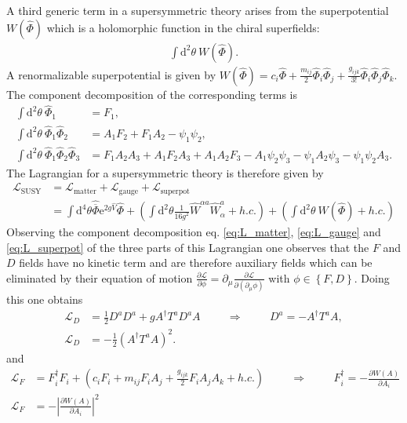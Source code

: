 A third generic term in a supersymmetric theory arises from the superpotential $W(\hat{\Phi})$ which is a holomorphic function in the chiral superfields:
\begin{align}
\int\mathrm{d}^2\theta\ W(\hat{\Phi}).
\end{align}
A renormalizable superpotential is given by $W(\hat{\Phi}) = c_i\hat{\Phi} + \frac{m_{ij}}{2}\hat{\Phi}_i\hat{\Phi}_j + \frac{g_{ijk}}{3!}\hat{\Phi}_i\hat{\Phi}_j\hat{\Phi}_k$. The component decomposition of the corresponding terms is
\begin{align}
\int\mathrm{d}^2\theta\ \hat{\Phi}_1 &= F_1,\nonumber\\
\int\mathrm{d}^2\theta\ \hat{\Phi}_1\hat{\Phi}_2 &= A_1F_2 + F_1A_2-\psi_1\psi_2,\nonumber\\
\int\mathrm{d}^2\theta\ \hat{\Phi}_1\hat{\Phi}_2\hat{\Phi}_3 &= F_1A_2A_3 + A_1F_2A_3 + A_1A_2F_3 - A_1\psi_2\psi_3 - \psi_1A_2\psi_3 - \psi_1\psi_2A_3.\label{eq:L_superpot}
\end{align}
The Lagrangian for a supersymmetric theory is therefore given by 
\begin{align}
\mathcal{L}_{\mathrm{SUSY}} &= \mathcal{L}_{\mathrm{matter}} + \mathcal{L}_{\mathrm{gauge}} + \mathcal{L}_{\mathrm{superpot}}\nonumber\\
&=\int\mathrm{d}^4\theta\hat{\overline{\Phi}}\mathrm{e}^{2g\hat{V}}\hat{\Phi} + \left(\int\mathrm{d}^2\theta \frac{1}{16g^2 }\hat{W}^{\alpha a} \hat{W}^a_\alpha + h.c. \right) + \left(\int\mathrm{d}^2\theta\ W(\hat{\Phi}) + h.c. \right)
\end{align}
Observing the component decomposition eq. \eqref{eq:L_matter}, \eqref{eq:L_gauge} and \eqref{eq:L_superpot} of the three parts of this Lagrangian one observes that the $F$ and $D$ fields have no kinetic term and are therefore auxiliary fields which can be eliminated by their equation of motion $\frac{\partial \mathcal{L}}{\partial\phi} = \partial_\mu\frac{\partial \mathcal{L}}{\partial(\partial_\mu \phi)}$ with $\phi \in \left\{ F, D \right\}$. Doing this one obtains
\begin{align}
\mathcal{L}_D &= \frac{1}{2} D^aD^a + g A^\dagger T^aD^a A \hspace{1cm} \Rightarrow \hspace{1cm} D^a = - A^\dagger T^a A, \nonumber\\
\mathcal{L}_D &= -\frac{1}{2}\left( A^\dagger T^a A \right)^2.
\end{align}
and 
\begin{align}
\mathcal{L}_F &= F_i^\dagger F_i + \left( c_iF_i + m_{ij}F_iA_j + \frac{g_{ijk}}{2}F_iA_jA_k + h.c. \right) \hspace{1cm} \Rightarrow \hspace{1cm} F^\dagger_i = - \frac{\partial W(A)}{\partial A_i}\nonumber\\
\mathcal{L}_F &= -\left| \frac{\partial W(A)}{\partial A_i} \right|^2
\end{align}



